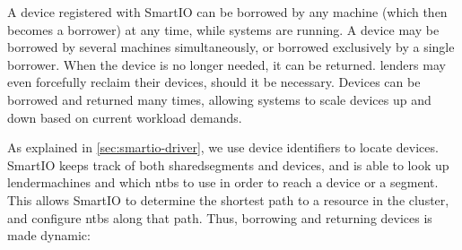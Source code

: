 \objdynamic*%
%
A device registered with SmartIO can be borrowed by any machine (which then becomes a \gls{borrower}) at any time, while systems are running.
%
A device may be borrowed by several machines simultaneously, or borrowed exclusively by a single \gls{borrower}.
%
When the device is no longer needed, it can be returned.
%
\Glspl{lender} may even forcefully reclaim their devices, should it be necessary.
%
Devices can be borrowed and returned many times, allowing systems to scale devices up and down based on current workload demands.


As explained in \cref{sec:smartio-driver}, we use device identifiers to locate devices.
%
SmartIO keeps track of both \glspl{sharedsegment} and devices, and is able to look up \glspl{lendermachine} and which \glspl{ntb} to use in order to reach a device or a \gls{segment}. 
%
This allows SmartIO to determine the shortest path to a resource in the cluster, and configure \glspl{ntb} along that path.
%
Thus, borrowing and returning devices is made dynamic:
%
